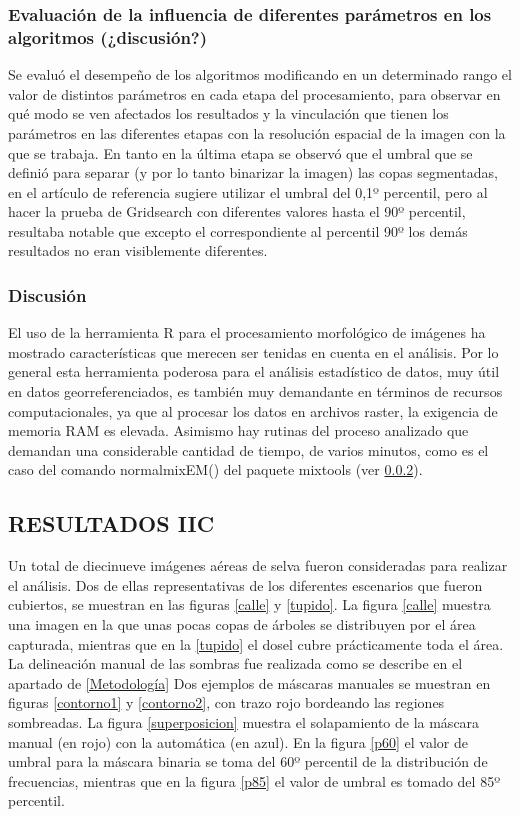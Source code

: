 

\subsubsection{Evaluación de la influencia de diferentes parámetros en los algoritmos (¿discusión?)}
Se evaluó el desempeño de los algoritmos modificando en un determinado rango el valor de distintos parámetros en cada etapa del procesamiento, para observar en qué modo se ven afectados los resultados y la vinculación que tienen los parámetros en las diferentes etapas con la resolución espacial de la imagen con la que se trabaja. En tanto en la última etapa se observó que el umbral
que se definió para separar (y por lo tanto binarizar la imagen) las copas segmentadas, en el artículo de referencia sugiere utilizar el umbral del 0,1º percentil, pero al hacer la prueba de Gridsearch con diferentes valores hasta el 90º percentil, resultaba notable que excepto el correspondiente al percentil 90º los demás resultados no eran visiblemente
diferentes.

\subsubsection{Discusión}
El uso de la herramienta R para el procesamiento morfológico de imágenes ha mostrado características que merecen ser tenidas en cuenta en el análisis. Por lo general esta herramienta poderosa para el análisis estadístico de datos, muy útil en datos georreferenciados, es también muy demandante en términos de recursos computacionales, ya que al procesar los datos en archivos raster, la exigencia de memoria RAM es elevada. Asimismo hay rutinas del proceso analizado que demandan una considerable cantidad de tiempo, de varios minutos, como es el caso del comando  normalmixEM() del paquete mixtools (ver \ref{}).


\subsection{RESULTADOS IIC} \label{Resultados IIC}
Un total de diecinueve imágenes aéreas de selva fueron consideradas para realizar el análisis. Dos de ellas representativas de los diferentes escenarios que fueron cubiertos, se muestran en las figuras \ref{calle} y \ref{tupido}. La figura \ref{calle} muestra una imagen en la que unas pocas copas de árboles se distribuyen por el área capturada, mientras que en la \ref{tupido} el dosel cubre prácticamente toda el área. La delineación manual de las sombras fue realizada como se describe en el apartado de \ref{Metodología}
Dos ejemplos de máscaras manuales se muestran en figuras \ref{contorno1} y \ref{contorno2}, con trazo rojo bordeando las regiones sombreadas. La figura \ref{superposicion} muestra el solapamiento de la máscara manual (en rojo) con la automática (en azul). En la figura \ref{p60} el valor de umbral para la máscara binaria se toma del 60º percentil de la distribución de frecuencias, mientras que en la figura \ref{p85} el valor de umbral es tomado del 85º percentil.


